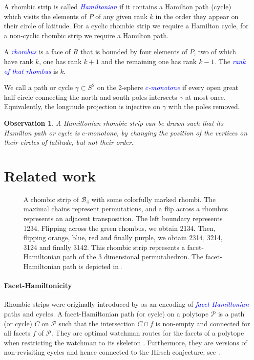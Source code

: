 \documentclass[fontsize=11pt,a4paper,DIV=12]{scrartcl}
\newcommand{\defn}[1]{\textsl{\textcolor{Blue}{#1}}}
\newtheorem{observation}[theorem]{Observation}
\begin{document}
A rhombic strip is called \defn{Hamiltonian} if it contains a Hamilton path (cycle) which visits the elements of $P$ of any given rank $k$ in the order they appear on their circle of latitude. For a cyclic rhombic strip we require a Hamilton cycle, for a non-cyclic rhombic strip we require a Hamilton path.

A \defn{rhombus} is a face of $R$ that is bounded by four elements of $P$, two of which have rank $k$, one has rank $k+1$ and the remaining one has rank $k-1$. The \defn{rank of that rhombus} is $k$.

We call a path or cycle $\gamma\subset S^2$ on the 2-sphere \defn{$c$-monotone} if every open great half circle connecting the north and south poles intersects $\gamma$ at most once. Equivalently, the longitude projection is injective on $\gamma$ with the poles removed.
\begin{observation}
	A Hamiltonian rhombic strip can be drawn such that its Hamilton path or cycle is $c$-monotone, by changing the position of the vertices on their circles of latitude, but not their order.
\end{observation}

\section{Related work}\label{sec:related}

\begin{figure}
	\centering
	
	\caption{A rhombic strip of $\mathcal B_4$ with some colorfully marked rhombi. The maximal chains represent permutations, and a flip across a rhombus represents an adjacent transposition. The left boundary represents 1234. Flipping across the green rhombus, we obtain 2134. Then, flipping orange, blue, red and finally purple, we obtain 2314, 3214, 3124 and finally 3142. This rhombic strip represents a facet-Hamiltonian path of the 3 dimensional permutahedron. The facet-Hamiltonian path is depicted in .}
	\label{fig:rhombic to fh example}
\end{figure}

\paragraph{Facet-Hamiltonicity}
Rhombic strips were originally introduced by \textcite{facethamiltonicity} as an encoding of \defn{facet-Hamiltonian} paths and cycles. A facet-Hamiltonian path (or cycle) on a polytope $\mathcal P$ is a path (or cycle) $C$ on $\mathcal P$ such that the intersection $C\cap f$ is non-empty and connected for all facets $f$ of $\mathcal P$. They are optimal watchman routes for the facets of a polytope when restricting the watchman to its skeleton \cite{watchmanChin, watchmanLines, watchmanSimple, watchmanApproximation}. Furthermore, they are versions of non-revisiting cycles and hence connected to the Hirsch conjecture, see \cite{non-revisiting1, non-revisiting2, non-revisiting3, non-revisiting4, non-revisiting5}.
\end{document}
